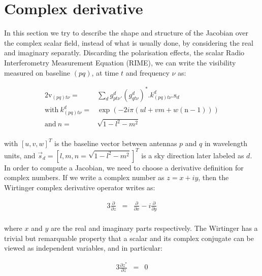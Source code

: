 \section{Complex derivative}

\newcommand{\conj}[1]{{#1}^*}
\newcommand{\conjp}[1]{{\left(#1\right)}^*}
\def\Jacob{\bm{\mathcal{J}}}

In this section we try to describe the shape and structure of the
Jacobian over the complex scalar field, instead of what is usually done, by
considering the real and imaginary separatly. Discarding the
polarisation effects, the scalar Radio Interferometry Measurement
Equation (RIME), we can write the visibility measured on baseline
$(pq)$, at time $t$ and frequency $\nu$ as:

\def\u{u}
\def\v{v}
\def\w{w}
\def\l{l}
\def\m{m}
\def\n{n}

\begin{alignat}{2}
\label{eq:ME}
\mathrm{v}_{(pq)t\nu}=&\displaystyle\sum\limits_{d} g^{d}_{pt\nu}
.\conjp{g^{d}_{qt\nu}}.k^{d}_{(pq)t\nu}.\mathrm{s}_{d}\\
\text{with}\ k^{d}_{(pq)t\nu}=&\exp{\left(-2 i\pi
  \left(\u\l+\v\m+\w\left(\text{n}-1\right)\right)\right)}\\
\text{and}\ \n=&\sqrt{1-\l^2-\m^2}\\
\end{alignat}

\noindent with $[\u,\v,\w]^T$ is the baseline vector between antennas
$p$ and $q$ in wavelength units, and
$\vec{s}_d=[\l,\m,\n=\sqrt{1-\l^2-\m^2}]^T$ is a sky direction later
labeled as $d$. In order to compute a Jacobian, we need to choose a
derivative definition for complex numbers. If we write a complex number as $z=x+iy$, then the
Wirtinger complex derivative operator writes as:


\begin{alignat}{3}
\frac{\partial }{\partial z}&=&\frac{\partial }{\partial x}-i\frac{\partial }{\partial y}\\
\end{alignat}

\noindent where $x$ and $y$ are the real and imaginary parts
respectively. The Wirtinger has a trivial but remarquable property
that a scalar and its complex conjugate can be viewed as independent
variables, and in particular: 

\begin{alignat}{3}
\label{eq:propConj}
\frac{\partial \conj{z}}{\partial z}&=&0
\end{alignat}


